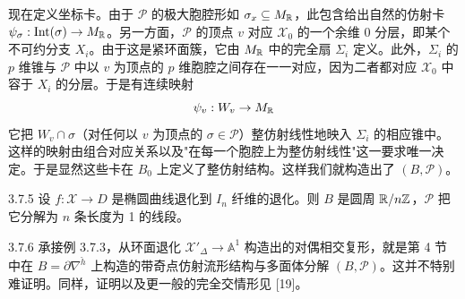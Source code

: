 现在定义坐标卡。由于 $\mathcal P$ 的极大胞腔形如 $\sigma_x\subseteq M_{\mathbb{R}}$，此包含给出自然的仿射卡 $\psi_\sigma:\operatorname{Int}(\sigma)\to M_{\mathbb{R}}$。另一方面，$\mathcal P$ 的顶点 $v$ 对应 $\mathcal X_0$ 的一个余维 0 分层，即某个不可约分支 $X_i$。由于这是紧环面簇，它由 $M_{\mathbb{R}}$ 中的完全扇 $\Sigma_i$ 定义。此外，$\Sigma_i$ 的 $p$ 维锥与 $\mathcal P$ 中以 $v$ 为顶点的 $p$ 维胞腔之间存在一一对应，因为二者都对应 $\mathcal X_0$ 中容于 $X_i$ 的分层。于是有连续映射
\[
\psi_v:W_v\to M_{\mathbb{R}}
\]
它把 $W_v\cap\sigma$（对任何以 $v$ 为顶点的 $\sigma\in\mathcal P$）整仿射线性地映入 $\Sigma_i$ 的相应锥中。这样的映射由组合对应关系以及"在每一个胞腔上为整仿射线性"这一要求唯一决定。于是显然这些卡在 $B_0$ 上定义了整仿射结构。这样我们就构造出了 $(B,\mathcal P)$。

\begin{example}{3.7.5}
设 $f:\mathcal X\to D$ 是椭圆曲线退化到 $I_n$ 纤维的退化。则 $B$ 是圆周 $\mathbb{R}/n\mathbb{Z}$，$\mathcal P$ 把它分解为 $n$ 条长度为 1 的线段。
\end{example}

\begin{example}{3.7.6}
承接例 3.7.3，从环面退化 $\mathcal X'_\Delta\to\mathbb A^1$ 构造出的对偶相交复形，就是第 4 节中在 $B=\partial\nabla^{\check h}$ 上构造的带奇点仿射流形结构与多面体分解 $(B,\mathcal P)$。这并不特别难证明。同样，证明以及更一般的完全交情形见 [19]。
\end{example}
